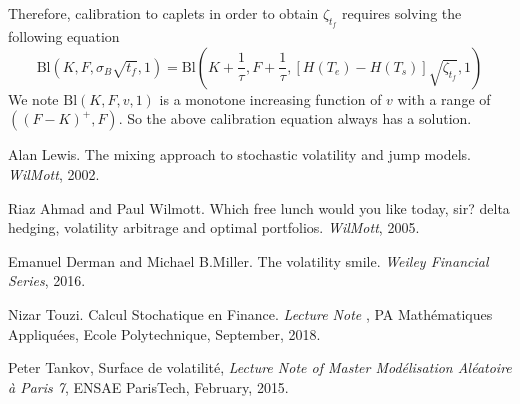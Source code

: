 \documentclass[10pt]{article}
\theoremstyle{plain}
\numberwithin{equation}{section}
\numberwithin{table}{section}
\begin{document}
Therefore, calibration to caplets in order to obtain $\zeta_{t_f}$ requires solving the following equation
\[
\boxed{
\mbox{Bl}(K, F, \sigma_B\sqrt{t_f}, 1) = \mbox{Bl}\left(K+\frac{1}{\tau}, F+\frac{1}{\tau}, \left[H(T_e)-H(T_s)\right] \sqrt{\zeta_{t_f}}, 1\right)
}
\]
We note $\mbox{Bl}(K, F, v, 1)$ is a monotone increasing function of $v$ with a range of $((F-K)^+, F)$. So the above calibration equation always has a solution.



\begin{appendix}


\end{appendix}
\newpage

\begin{thebibliography}{99}

 Alan Lewis. The mixing approach to stochastic volatility and jump models. {\it
WilMott}, 2002.

 Riaz Ahmad and Paul Wilmott. Which free lunch would you like today, sir? delta hedging, volatility arbitrage and optimal portfolios. {\it
WilMott}, 2005.
    
 Emanuel Derman and Michael B.Miller. The volatility smile. {\it
Weiley Financial Series}, 2016.

 Nizar Touzi. Calcul Stochatique en Finance. {\it
Lecture Note} {\bf}, PA Math\'ematiques Appliqu\'ees, Ecole Polytechnique, September, 2018.

 Peter Tankov, Surface de volatilit\'e, {\it
Lecture Note of Master Mod\'elisation Al\'eatoire \`a Paris 7}, ENSAE ParisTech, February, 2015.

\end{thebibliography}
\end{document}
